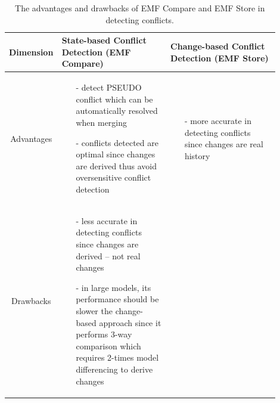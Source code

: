 \begin{table}[]
  \centering
  \caption{The advantages and drawbacks of EMF Compare and EMF Store in detecting conflicts.}
  \label{tab:accuracy_emfcompare_emfstore}
  \begin{tabular}{|p{0.1\linewidth}|p{0.4\linewidth}|p{0.4\linewidth}|}
    \hline
    \textbf{Dimension}
    & \textbf{State-based Conflict Detection (EMF Compare)}
    & \textbf{Change-based Conflict Detection (EMF Store)}\\
    \hline
    \multicolumn{1}{|c|}{Advantages}
    &
    \begin{minipage}[t]{\linewidth}
      \raggedright
      \begin{itemize}[leftmargin=9pt]
        \setlength\itemsep{2pt}
        \item[-] detect \textsf{PSEUDO} conflict which can be automatically resolved when merging
        \item[-] conflicts detected are optimal since changes are derived thus avoid oversensitive conflict detection
        \item[]
      \end{itemize}
    \end{minipage}
    &
    \begin{minipage}[t]{\linewidth}
      \raggedright
      \begin{itemize}[leftmargin=9pt]
        \setlength\itemsep{2pt}
        \item[-] more accurate in detecting conflicts since changes are real history
        \item[]
      \end{itemize} 
    \end{minipage}
    \\ 
    \hline
    \multicolumn{1}{|c|}{Drawbacks}
    &
    \begin{minipage}[t]{\linewidth}
      \raggedright
      \begin{itemize}[leftmargin=9pt]
        \setlength\itemsep{2pt}
        \item[-] less accurate in detecting conflicts since changes are derived -- not real changes
        \item[-] in large models, its performance should be slower the change-based approach since it performs 3-way comparison which requires 2-times model differencing to derive changes 
        \item[]
      \end{itemize}
    \end{minipage}

\end{tabular}
\end{table}
